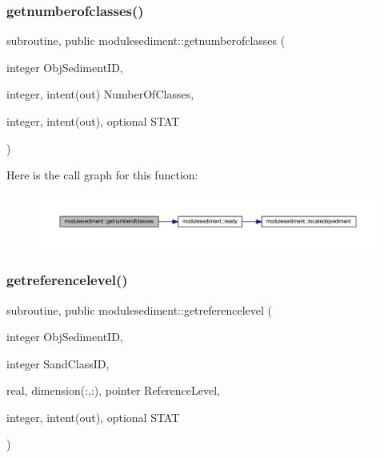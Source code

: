 \subsubsection{\texorpdfstring{getnumberofclasses()}{getnumberofclasses()}}
{\footnotesize\ttfamily subroutine, public modulesediment\+::getnumberofclasses (\begin{DoxyParamCaption}\item[{integer}]{Obj\+Sediment\+ID,  }\item[{integer, intent(out)}]{Number\+Of\+Classes,  }\item[{integer, intent(out), optional}]{S\+T\+AT }\end{DoxyParamCaption})}

Here is the call graph for this function\+:\nopagebreak
\begin{figure}[H]
\begin{center}
\leavevmode
\includegraphics[width=350pt]{namespacemodulesediment_a1b6836cb590222a61d3ec36961ce22c2_cgraph}
\end{center}
\end{figure}
\mbox{\label{namespacemodulesediment_ad8d5d321d848d9df2cc84a9c53bc5ec1}} 
\subsubsection{\texorpdfstring{getreferencelevel()}{getreferencelevel()}}
{\footnotesize\ttfamily subroutine, public modulesediment\+::getreferencelevel (\begin{DoxyParamCaption}\item[{integer}]{Obj\+Sediment\+ID,  }\item[{integer}]{Sand\+Class\+ID,  }\item[{real, dimension(\+:,\+:), pointer}]{Reference\+Level,  }\item[{integer, intent(out), optional}]{S\+T\+AT }\end{DoxyParamCaption})}


